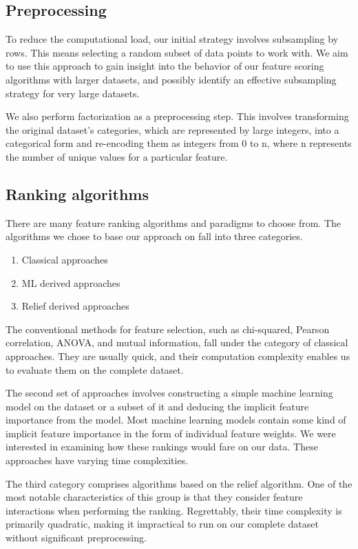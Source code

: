 \documentclass[fleqn,moreauthors,10pt]{ds_report}
\begin{document}
\subsection*{Preprocessing}
To reduce the computational load, our initial strategy involves subsampling by rows. This means selecting a random subset of data points to work with. We aim to use this approach to gain insight into the behavior of our feature scoring algorithms with larger datasets, and possibly identify an effective subsampling strategy for very large datasets. 

We also perform factorization as a preprocessing step. This involves transforming the original dataset's categories, which are represented by large integers, into a categorical form and re-encoding them as integers from 0 to n, where n represents the number of unique values for a particular feature.

\subsection*{Ranking algorithms}

There are many feature ranking algorithms and paradigms to choose from. The algorithms we chose to base our approach on fall into three categories.

\begin{enumerate}
    \item Classical approaches
    \item ML derived approaches
    \item Relief derived approaches
\end{enumerate}

The conventional methods for feature selection, such as chi-squared, Pearson correlation, ANOVA, and mutual information, fall under the category of classical approaches. They are usually quick, and their computation complexity enables us to evaluate them on the complete dataset.

The second set of approaches involves constructing a simple machine learning model on the dataset or a subset of it and deducing the implicit feature importance from the model. Most machine learning models contain some kind of implicit feature importance in the form of individual feature weights. We were interested in examining how these rankings would fare on our data. These approaches have varying time complexities.

The third category comprises algorithms based on the relief algorithm. One of the most notable characteristics of this group is that they consider feature interactions when performing the ranking. Regrettably, their time complexity is primarily quadratic, making it impractical to run on our complete dataset without significant preprocessing.
\end{document}
